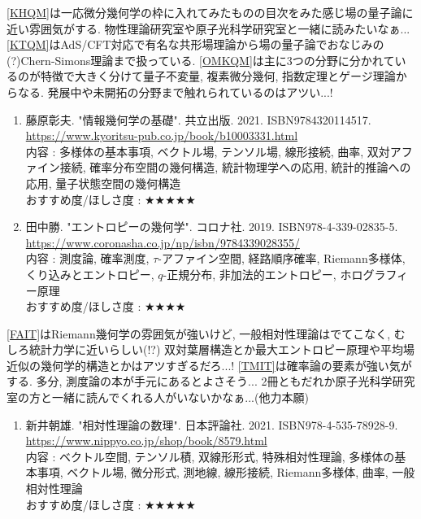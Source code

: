 \documentclass[10pt,a4paper]{jsarticle}
\begin{document}
    \ref{KHQM}は一応微分幾何学の枠に入れてみたものの目次をみた感じ場の量子論に近い雰囲気がする. 物性理論研究室や原子光科学研究室と一緒に読みたいなぁ... \ref{KTQM}はAdS/CFT対応で有名な共形場理論から場の量子論でおなじみの(?)Chern-Simons理論まで扱っている. \ref{OMKQM}は主に3つの分野に分かれているのが特徴で大きく分けて量子不変量, 複素微分幾何, 指数定理とゲージ理論からなる. 発展中や未開拓の分野まで触れられているのはアツい...! 
    \begin{enumerate}
        \renewcommand{\theenumi}{[IT\arabic{enumi}]}
        \renewcommand{\labelenumi}{\theenumi}
        \setcounter{enumi}{0}
        \item \label{FAIT} 藤原彰夫. "情報幾何学の基礎". 共立出版. 2021. ISBN9784320114517. \\
        \url{https://www.kyoritsu-pub.co.jp/book/b10003331.html} \\
        内容 : 多様体の基本事項, ベクトル場, テンソル場, 線形接続, 曲率, 双対アファイン接続, 確率分布空間の幾何構造, 統計物理学への応用, 統計的推論への応用, 量子状態空間の幾何構造\\
        おすすめ度/ほしさ度 : $\bigstar \bigstar \bigstar \bigstar \bigstar $
        \item \label{TMIT} 田中勝. "エントロピーの幾何学". コロナ社. 2019. ISBN978-4-339-02835-5. \\
        \url{https://www.coronasha.co.jp/np/isbn/9784339028355/} \\
        内容 : 測度論, 確率測度, $\tau$-アファイン空間, 経路順序確率, Riemann多様体, くり込みとエントロピー, $q$-正規分布, 非加法的エントロピー, ホログラフィー原理\\
        おすすめ度/ほしさ度 : $\bigstar \bigstar \bigstar \bigstar $
    \end{enumerate}\par
    \ref{FAIT}はRiemann幾何学の雰囲気が強いけど, 一般相対性理論はでてこなく, むしろ統計力学に近いらしい(!?) 双対葉層構造とか最大エントロピー原理や平均場近似の幾何学的構造とかはアツすぎるだろ...! \ref{TMIT}は確率論の要素が強い気がする. 多分, 測度論の本が手元にあるとよさそう... 2冊ともだれか原子光科学研究室の方と一緒に読んでくれる人がいないかなぁ...(他力本願)
    \begin{enumerate}
        \renewcommand{\theenumi}{[RT\arabic{enumi}]}
        \renewcommand{\labelenumi}{\theenumi}
        \setcounter{enumi}{0}
        \item \label{AART} 新井朝雄. "相対性理論の数理". 日本評論社. 2021. ISBN978-4-535-78928-9. \\
        \url{https://www.nippyo.co.jp/shop/book/8579.html} \\
        内容 : ベクトル空間, テンソル積, 双線形形式, 特殊相対性理論, 多様体の基本事項, ベクトル場, 微分形式, 測地線, 線形接続, Riemann多様体, 曲率, 一般相対性理論\\
        おすすめ度/ほしさ度 : $\bigstar \bigstar \bigstar \bigstar \bigstar $
    \end{enumerate}\par
\end{document}
